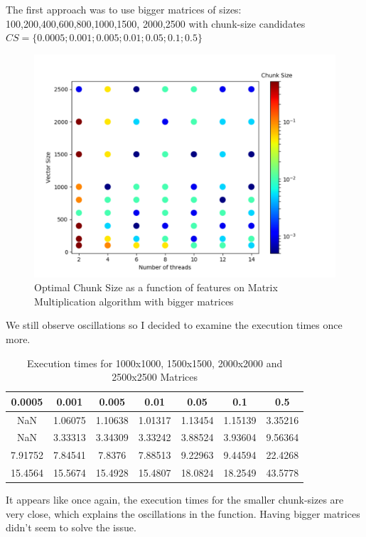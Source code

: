 The first approach was to use bigger matrices of sizes:
100,200,400,600,800,1000,1500,
2000,2500 with chunk-size candidates $CS=\{0.0005;0.001; 0.005; 0.01; 0.05; 0.1;0.5\}$

\begin{figure}[H]
	\centering
	\includegraphics[width=120mm]{images/chunk_size_function_matrix_big.pdf}
	\caption{Optimal Chunk Size as a function of features on Matrix Multiplication algorithm with bigger matrices}
\end{figure}

We still observe oscillations so I decided to examine the execution times once more.

\begin{table}[h]
	\centering
	\caption{Execution times for 1000x1000, 1500x1500, 2000x2000 and 2500x2500 Matrices}
	\label{my-label}
	\begin{tabular}{|c|c|c|c|c|c|c|}
		\hline
		0.0005  & 0.001   & 0.005   & 0.01    & 0.05    & 0.1     & 0.5     \\ \hline
		NaN     & 1.06075 & 1.10638 & 1.01317 & 1.13454 & 1.15139 & 3.35216 \\ \hline
		NaN     & 3.33313 & 3.34309 & 3.33242 & 3.88524 & 3.93604 & 9.56364 \\ \hline
		7.91752 & 7.84541 & 7.8376  & 7.88513 & 9.22963 & 9.44594 & 22.4268 \\ \hline
		15.4564 & 15.5674 & 15.4928 & 15.4807 & 18.0824 & 18.2549 & 43.5778 \\ \hline
	\end{tabular}
\end{table}

It appears like once again, the execution times for the smaller chunk-sizes are very close, which explains the oscillations in the function. Having bigger matrices didn't seem to solve the issue.

